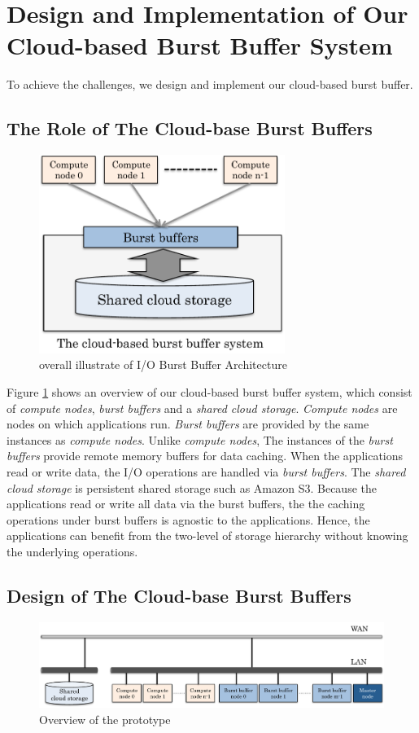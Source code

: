 \section{Design and Implementation of Our Cloud-based Burst Buffer System}
\label{sec:implementation}
To achieve the challenges, we design and implement our cloud-based burst buffer.

\subsection{The Role of The Cloud-base Burst Buffers}
\begin{figure}[tb]
	\centering
	\includegraphics[width=8cm]{img/architecture_overview-2}
	\caption{overall illustrate of I/O Burst Buffer Architecture}
	\label{architecture:overview}
\end{figure}

Figure \ref{architecture:overview} shows an overview of our cloud-based
burst buffer system, which consist of \emph{compute nodes}, \emph{burst buffers}
and a \emph{shared cloud storage}. \emph{Compute nodes} are nodes on which
applications run. \emph{Burst buffers} are provided by the same instances
as \emph{compute nodes}. Unlike \emph{compute nodes}, The instances
of the \emph{burst buffers} provide remote memory buffers for data caching.
When the applications read or write data, the I/O operations are handled via
\emph{burst buffers}.  The \emph{shared cloud storage} is persistent shared storage such as Amazon S3.
Because the applications read or write all data via the burst buffers, the
the caching operations under burst buffers is agnostic to the applications.
Hence, the applications can benefit from the two-level of storage hierarchy
without knowing the underlying operations.

\subsection{Design of The Cloud-base Burst Buffers}
\begin{figure}
\centering
\includegraphics[width=16cm]{img/prototype_overview-2}
\caption{Overview of the prototype}
\label{implemetation:overview of prototype}
\end{figure}

